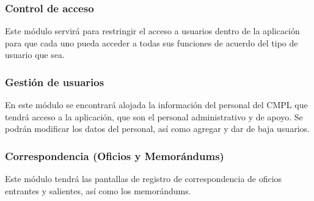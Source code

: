 \subsubsection{Control de acceso}

Este módulo servirá para restringir el acceso a usuarios dentro de la aplicación para que cada uno pueda acceder a todas sus funciones de acuerdo del tipo de usuario que sea.\\ %

\subsubsection{Gestión de usuarios}
En este módulo se encontrará alojada la información del personal del CMPL que tendrá acceso a la aplicación, que son el personal administrativo y de apoyo. Se podrán modificar los datos del personal, así como agregar y dar de baja usuarios. \\ %

\subsubsection{Correspondencia (Oficios y Memorándums)}
Este módulo tendrá las pantallas de registro de correspondencia de oficios entrantes y salientes, así como los memorándums.\\ %

